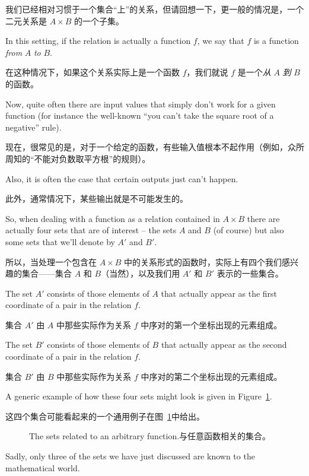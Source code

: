 我们已经相对习惯于一个集合“上”的关系，但请回想一下，更一般的情况是，一个二元关系是 $A \times B$ 的一个子集。

In this setting, if the relation is 
actually a function $f$, we say that $f$ is a function \emph{from} $A$
\emph{to} $B$.

在这种情况下，如果这个关系实际上是一个函数 $f$，我们就说 $f$ 是一个\emph{从} $A$ \emph{到} $B$ 的函数。

Now, quite often there are input values  that simply don't 
work for a given function (for instance the well-known ``you can't take
the square root of a negative'' rule).

现在，很常见的是，对于一个给定的函数，有些输入值根本不起作用（例如，众所周知的“不能对负数取平方根”的规则）。

Also, it is often the case that
certain outputs just can't happen.

此外，通常情况下，某些输出就是不可能发生的。

So, when dealing with a function
as a relation contained in $A \times B$ there are actually four sets
that are of interest -- the sets $A$ and $B$ (of course) but also some
sets that we'll denote by $A'$ and $B'$.

所以，当处理一个包含在 $A \times B$ 中的关系形式的函数时，实际上有四个我们感兴趣的集合——集合 $A$ 和 $B$（当然），以及我们用 $A'$ 和 $B'$ 表示的一些集合。

The set $A'$ consists of those
elements of $A$ that actually appear as the first coordinate of a pair
in the relation $f$.

集合 $A'$ 由 $A$ 中那些实际作为关系 $f$ 中序对的第一个坐标出现的元素组成。

The set $B'$ consists of those elements of $B$
that actually appear as the second coordinate of a pair in the relation $f$.

集合 $B'$ 由 $B$ 中那些实际作为关系 $f$ 中序对的第二个坐标出现的元素组成。

A generic example of how these four sets might look is given in Figure~\ref{fig:generic_function}.

这四个集合可能看起来的一个通用例子在图~\ref{fig:generic_function}中给出。

\begin{figure}[!hbtp]

\caption{The sets related to an arbitrary function.与任意函数相关的集合。}
\label{fig:generic_function} 
\end{figure}

Sadly, only three of the sets we have just discussed are known to
the mathematical world.

